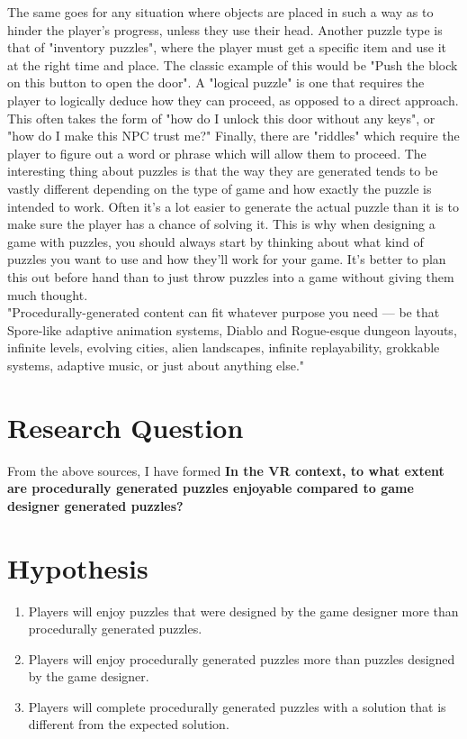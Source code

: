 \documentclass[lettersize,journal]{IEEEtran}
\begin{document}
The same goes for any situation where objects are placed in such a way as to hinder the player's progress, unless they use their head.
Another puzzle type is that of "inventory puzzles", where the player must get a specific item and use it at the right time and place. The classic example of this would be "Push the block on this button to open the door".
A "logical puzzle" is one that requires the player to logically deduce how they can proceed, as opposed to a direct approach. This often takes the form of "how do I unlock this door without any keys", or "how do I make this NPC trust me?"
Finally, there are "riddles" which require the player to figure out a word or phrase which will allow them to proceed.
The interesting thing about puzzles is that the way they are generated tends to be vastly different depending on the type of game and how exactly the puzzle is intended to work.
Often it's a lot easier to generate the actual puzzle than it is to make sure the player has a chance of solving it.
This is why when designing a game with puzzles, you should always start by thinking about what kind of puzzles you want to use and how they'll work for your game. It's better to plan this out before hand than to just throw puzzles into a game without giving them much thought.
\\"Procedurally-generated content can fit whatever purpose you need — be that Spore-like adaptive animation systems, Diablo and Rogue-esque dungeon layouts, infinite levels, evolving cities, alien landscapes, infinite replayability, grokkable systems, adaptive music, or just about anything else."\cite {gamDev}\cite {noMan}\cite {automaticGenDungeons}\cite {6017222}\cite {diablo}\cite {diablo2}
\section{Research Question}
    From the above sources, I have formed \textbf{In the VR context, to what extent are procedurally generated puzzles enjoyable compared to game designer generated puzzles?}

\section{Hypothesis}
\begin{enumerate}
 	\item Players will enjoy puzzles that were designed by the game designer more than procedurally generated puzzles.

	\item Players will enjoy procedurally generated puzzles more than puzzles designed by the game designer.

 	\item Players will complete procedurally generated puzzles with a solution that is different from the expected solution.
\end{enumerate}
\end{document}
